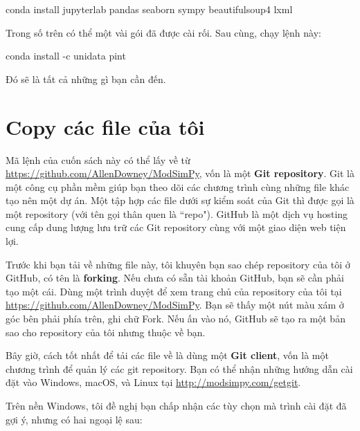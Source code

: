 \documentclass[12pt]{book}
\theoremstyle{exercise}
\newcommand{\py}{\verb}%}
\begin{document}
\begin{code}
conda install jupyterlab pandas seaborn sympy beautifulsoup4 lxml
\end{code}

Trong số trên có thể một vài gói đã được cài rối. Sau cùng, chạy lệnh này:

\begin{code}
conda install -c unidata pint
\end{code}

Đó sẽ là tất cả những gì bạn cần đến.


\section{Copy các file của tôi}

Mã lệnh của cuốn sách này có thể lấy về từ 
\url{https://github.com/AllenDowney/ModSimPy}, vốn là một {\bf Git repository}.  Git là một công cụ phần mềm giúp bạn theo dõi các chương trình cùng những file khác tạo nên một dự án. Một tập hợp các file dưới sự kiểm soát của Git thì được gọi là một repository (với tên gọi thân quen là ``repo").  GitHub là một dịch vụ hosting cung cấp dung lượng lưu trữ các Git repository cùng với một giao diện web tiện lợi.


Trước khi bạn tải về những file này, tôi khuyên bạn sao chép repository của tôi ở GitHub, có tên là {\bf forking}.  Nếu chưa có sẵn tài khoản GitHub, bạn sẽ cần phải tạo một cái.  
Dùng một trình duyệt để xem trang chủ của repository của tôi tại \url{https://github.com/AllenDowney/ModSimPy}.   Bạn sẽ thấy một nút màu xám ở góc bên phải phía trên, ghi chữ {\sf Fork}.  Nếu ấn vào nó, GitHub sẽ tạo ra một bản sao cho repository của tôi nhưng thuộc về bạn.

Bây giờ, cách tốt nhất để tải các file về là dùng một {\bf Git client}, vốn là một chương trình để quản lý các git repository.  Bạn có thể nhận những hướng dẫn cài đặt vào Windows, macOS, và Linux tại \url{http://modsimpy.com/getgit}. 

Trên nền Windows, tôi đề nghị bạn chấp nhận các tùy chọn mà trình cài đặt đã gợi ý, nhưng có hai ngoại lệ sau:

\end{document}
